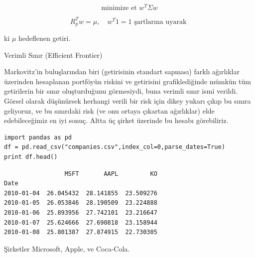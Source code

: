 \documentclass[12pt,fleqn]{article}\usepackage{../../common}
\begin{document}
$$ \textrm{minimize et } w^T \Sigma w $$

$$ R_p^T w = \mu, \quad w^T 1 = 1 \textrm{ şartlarına uyarak }$$


ki $\mu$ hedeflenen getiri.

Verimli Sınır (Efficient Frontier)

Markovitz'in buluşlarından biri (getirisinin standart sapması) farklı ağırlıklar
üzerinden hesaplanan portföyün riskini ve getirisini grafiklediğinde mümkün tüm
getirilerin bir sınır oluşturduğunu görmesiydi, buna verimli sınır ismi
verildi. Görsel olarak düşünürsek herhangi verili bir risk için dikey yukarı
çıkıp bu sınıra geliyoruz, ve bu sınırdaki risk (ve onu ortaya çıkartan
ağırlıklar) elde edebileceğimiz en iyi sonuç. Altta üç şirket üzerinde bu hesabı
görebiliriz.

\begin{verbatim}
import pandas as pd
df = pd.read_csv("companies.csv",index_col=0,parse_dates=True)
print df.head()
\end{verbatim}

\begin{verbatim}
                 MSFT       AAPL         KO
Date                                       
2010-01-04  26.045432  28.141855  23.509276
2010-01-05  26.053846  28.190509  23.224888
2010-01-06  25.893956  27.742101  23.216647
2010-01-07  25.624666  27.690818  23.158944
2010-01-08  25.801387  27.874915  22.730305
\end{verbatim}

Şirketler Microsoft, Apple, ve Coca-Cola.
\end{document}
